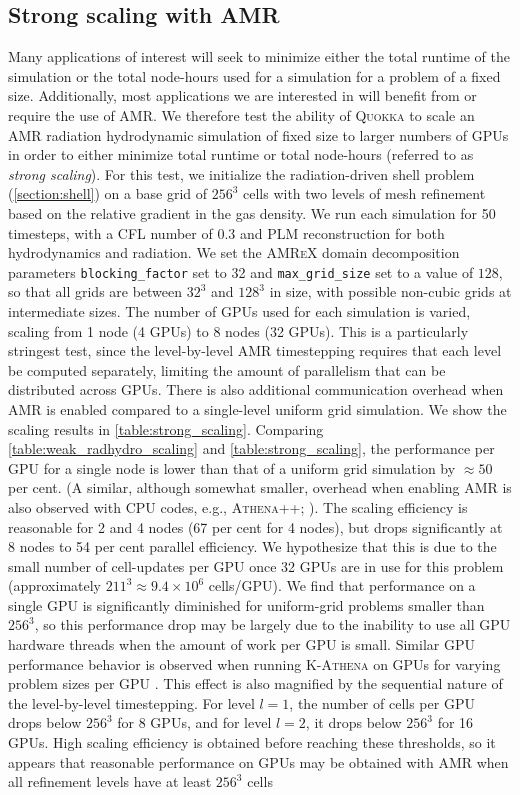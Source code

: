 \documentclass[fleqn,usenatbib]{mnras}
\begin{document}
\subsection{Strong scaling with AMR}
Many applications of interest will seek to minimize either the total runtime of the simulation or the total node-hours used for a simulation for a problem of a fixed size. Additionally, most applications we are interested in will benefit from or require the use of AMR.  We therefore test the ability of \textsc{Quokka} to scale an AMR radiation hydrodynamic simulation of fixed size to larger numbers of GPUs in order to either minimize total runtime or total node-hours (referred to as \emph{strong scaling}). For this test, we initialize the radiation-driven shell problem (\autoref{section:shell}) on a base grid of $256^3$ cells with two levels of mesh refinement based on the relative gradient in the gas density. We run each simulation for 50 timesteps, with a CFL number of $0.3$ and PLM reconstruction for both hydrodynamics and radiation. We set the \textsc{AMReX} domain decomposition parameters \texttt{blocking\_factor} set to 32 and \texttt{max\_grid\_size} set to a value of $128$, so that all grids are between $32^3$ and $128^3$ in size, with possible non-cubic grids at intermediate sizes. The number of GPUs used for each simulation is varied, scaling from 1 node (4 GPUs) to 8 nodes (32 GPUs). This is a particularly stringest test, since the level-by-level AMR timestepping requires that each level be computed separately, limiting the amount of parallelism that can be distributed across GPUs. There is also additional communication overhead when AMR is enabled compared to a single-level uniform grid simulation. We show the scaling results in \autoref{table:strong_scaling}. Comparing \autoref{table:weak_radhydro_scaling} and \autoref{table:strong_scaling}, the performance per GPU for a single node is lower than that of a uniform grid simulation by $\approx 50$ per cent. (A similar, although somewhat smaller, overhead when enabling AMR is also observed with CPU codes, e.g., \textsc{Athena++}; \citealt{Stone_2020}). The scaling efficiency is reasonable for 2 and 4 nodes (67 per cent for 4 nodes), but drops significantly at 8 nodes to 54 per cent parallel efficiency. We hypothesize that this is due to the small number of cell-updates per GPU once 32 GPUs are in use for this problem (approximately $211^3 \approx 9.4 \times 10^6$ cells/GPU). We find that performance on a single GPU is significantly diminished for uniform-grid problems smaller than $256^3$, so this performance drop may be largely due to the inability to use all GPU hardware threads when the amount of work per GPU is small. Similar GPU performance behavior is observed when running \textsc{K-Athena} on GPUs for varying problem sizes per GPU \citep{Grete_2019}. This effect is also magnified by the sequential nature of the level-by-level timestepping. For level $l=1$, the number of cells per GPU drops below $256^3$ for 8 GPUs, and for level $l=2$, it drops below $256^3$ for 16 GPUs. High scaling efficiency is obtained before reaching these thresholds, so it appears that reasonable performance on GPUs may be obtained with AMR when all refinement levels have at least $256^3$ cells 
\end{document}
